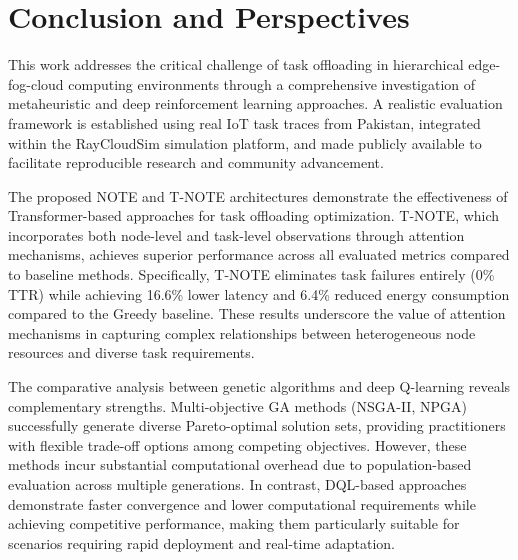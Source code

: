 \documentclass[preprint,3p,authoryear]{elsarticle}
\begin{document}



\section{Conclusion and Perspectives}\label{sec:conclusion}

This work addresses the critical challenge of task offloading in hierarchical edge-fog-cloud computing environments through a comprehensive investigation of metaheuristic and deep reinforcement learning approaches. A realistic evaluation framework is established using real IoT task traces from Pakistan, integrated within the RayCloudSim simulation platform, and made publicly available to facilitate reproducible research and community advancement.

The proposed NOTE and T-NOTE architectures demonstrate the effectiveness of Transformer-based approaches for task offloading optimization. T-NOTE, which incorporates both node-level and task-level observations through attention mechanisms, achieves superior performance across all evaluated metrics compared to baseline methods. Specifically, T-NOTE eliminates task failures entirely (0\% TTR) while achieving 16.6\% lower latency and 6.4\% reduced energy consumption compared to the Greedy baseline. These results underscore the value of attention mechanisms in capturing complex relationships between heterogeneous node resources and diverse task requirements.

The comparative analysis between genetic algorithms and deep Q-learning reveals complementary strengths. Multi-objective GA methods (NSGA-II, NPGA) successfully generate diverse Pareto-optimal solution sets, providing practitioners with flexible trade-off options among competing objectives. However, these methods incur substantial computational overhead due to population-based evaluation across multiple generations. In contrast, DQL-based approaches demonstrate faster convergence and lower computational requirements while achieving competitive performance, making them particularly suitable for scenarios requiring rapid deployment and real-time adaptation.
\end{document}
